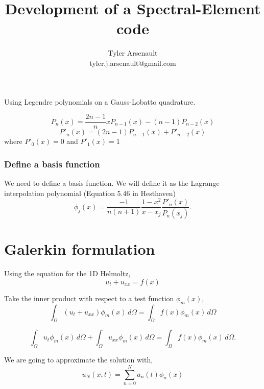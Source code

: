 \documentclass[12pt]{article}%
\title{Development of a Spectral-Element code}
\author{Tyler Arsenault\\ tyler.j.arsenault@gmail.com}
\date{}
\begin{document}
\maketitle

Using Legendre polynomials on a Gauss-Lobatto quadrature.

\begin{equation}
P_n(x)=\frac{2n-1}{n}xP_{n-1}(x)-(n-1)P_{n-2}(x)
\end{equation}
%
\begin{equation}P'_n(x)=(2n-1)P_{n-1}(x)+P'_{n-2}(x)
\end{equation}
where $P'_0(x)=0$ and $P'_1(x)=1$


\subsubsection*{Define a basis function}
We need to define a basis function.  We will define it as the Lagrange interpolation polynomial (Equation 5.46 in Hesthaven)
\begin{equation}
\phi_j(x)=\frac{-1}{n(n+1)}\frac{1-x^2}{x-x_j}\frac{P'_n(x)}{P_n(x_j)}
.\end{equation}


\section{Galerkin formulation}
Using the equation for the 1D Helmoltz,
\begin{equation}
u_t+u_{xx}=f(x)
\end{equation}

Take the inner product with respect to a test function $\phi_m(x)$,
\begin{equation}
\int_{\Omega} \left(u_t + u_{xx}\right) \phi_m(x)\,d\Omega=\int_{\Omega} f(x)\phi_m(x)\,d\Omega
\end{equation}

\begin{equation}\int_{\Omega} u_t\phi_m(x)\,d\Omega +\int_{\Omega}u_{xx} \phi_m(x)\,d\Omega=\int_{\Omega} f(x)\phi_m(x)\,d\Omega.
\end{equation}

We are going to approximate the solution with,
\begin{equation}
u_N(x,t)=\sum_{n=0}^Na_n(t)\phi_n(x)
\end{equation}
\end{document}
